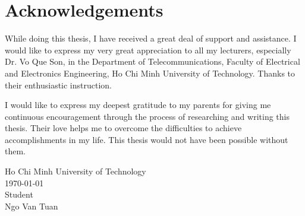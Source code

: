 \documentclass[\main/main.tex]{subfiles}
\begin{document}
\graphicspath{{imgs/}{00_misc/imgs/}}

\chapter*{Acknowledgements}
While doing this thesis, I have received a great deal of support and assistance. I would like to express my very great appreciation to all my lecturers, especially Dr. Vo Que Son, in the Department of Telecommunications, Faculty of Electrical and Electronics Engineering, Ho Chi Minh University of Technology. Thanks to their enthusiastic instruction.

I would like to express my deepest gratitude to my parents for giving me continuous encouragement through the process of researching and writing this thesis. Their love helps me to overcome the difficulties to achieve accomplishments in my life. This thesis would not have been possible without them.

\begin{flushright}
\parbox[t][4cm]{8cm}
{   \centering
    Ho Chi Minh University of Technology\\
    \today\\
    Student\\
    \vspace{2cm}
    Ngo Van Tuan
}
\end{flushright}
\end{document}
